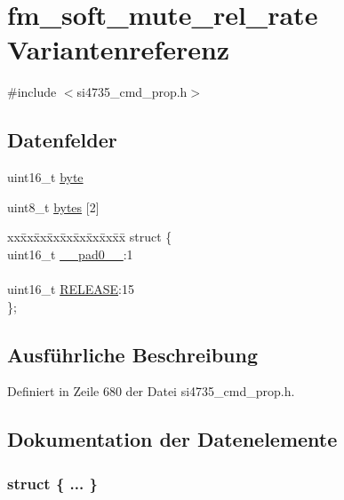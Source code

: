 \hypertarget{unionfm__soft__mute__rel__rate}{}\section{fm\+\_\+soft\+\_\+mute\+\_\+rel\+\_\+rate Variantenreferenz}
\label{unionfm__soft__mute__rel__rate}


{\ttfamily \#include $<$si4735\+\_\+cmd\+\_\+prop.\+h$>$}

\subsection*{Datenfelder}
\begin{DoxyCompactItemize}
\item 
uint16\+\_\+t \hyperlink{unionfm__soft__mute__rel__rate_ab0549c1b5ea980a02e7eab77e21fea49}{byte}
\item 
uint8\+\_\+t \hyperlink{unionfm__soft__mute__rel__rate_a46e4c05d20a047ec169f60d3167e912e}{bytes} \mbox{[}2\mbox{]}
\item 
\begin{tabbing}
xx\=xx\=xx\=xx\=xx\=xx\=xx\=xx\=xx\=\kill
struct \{\\
\>uint16\_t \hyperlink{unionfm__soft__mute__rel__rate_a77132c2c26a75f5b8751b235cda23828}{\_\_pad0\_\_}:1\\
\>\\
\>uint16\_t \hyperlink{unionfm__soft__mute__rel__rate_a11e93d50103a9c890a961d4571dae3b9}{RELEASE}:15\\
\}; \\

\end{tabbing}\end{DoxyCompactItemize}


\subsection{Ausführliche Beschreibung}


Definiert in Zeile 680 der Datei si4735\+\_\+cmd\+\_\+prop.\+h.



\subsection{Dokumentation der Datenelemente}
\hypertarget{unionfm__soft__mute__rel__rate_a8b5ac0271380142696eeeca75d2d713f}{}\subsubsection[{"@81}]{\setlength{\rightskip}{0pt plus 5cm}struct \{ ... \} }\label{unionfm__soft__mute__rel__rate_a8b5ac0271380142696eeeca75d2d713f}
\hypertarget{unionfm__soft__mute__rel__rate_a77132c2c26a75f5b8751b235cda23828}{}
